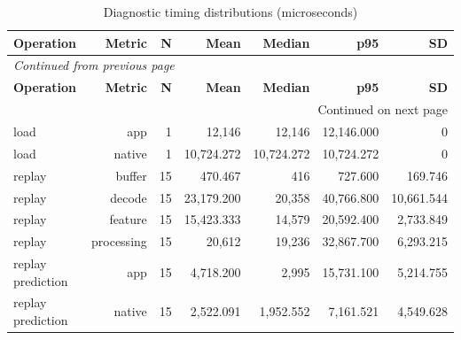 \documentclass[10pt,a4paper]{article}
\begin{document}
\begingroup\small\setlength{\tabcolsep}{4pt}\renewcommand{\arraystretch}{1.12}
\begin{longtable}{@{}lrrrrrr@{}}
\caption{Diagnostic timing distributions (microseconds)}\\
\toprule
\textbf{Operation} & \textbf{Metric} & \textbf{N} & \textbf{Mean} & \textbf{Median} & \textbf{p95} & \textbf{SD} \\
\midrule\endfirsthead
\multicolumn{7}{l}{\small\itshape Continued from previous page}\\
\toprule
\textbf{Operation} & \textbf{Metric} & \textbf{N} & \textbf{Mean} & \textbf{Median} & \textbf{p95} & \textbf{SD} \\
\midrule\endhead
\midrule\multicolumn{7}{r}{\small Continued on next page}\\\endfoot
\bottomrule\endlastfoot
load & app & 1 & 12,146 & 12,146 & 12,146.000 & 0 \\
load & native & 1 & 10,724.272 & 10,724.272 & 10,724.272 & 0 \\
replay & buffer & 15 & 470.467 & 416 & 727.600 & 169.746 \\
replay & decode & 15 & 23,179.200 & 20,358 & 40,766.800 & 10,661.544 \\
replay & feature & 15 & 15,423.333 & 14,579 & 20,592.400 & 2,733.849 \\
replay & processing & 15 & 20,612 & 19,236 & 32,867.700 & 6,293.215 \\
replay prediction & app & 15 & 4,718.200 & 2,995 & 15,731.100 & 5,214.755 \\
replay prediction & native & 15 & 2,522.091 & 1,952.552 & 7,161.521 & 4,549.628 \\
\end{longtable}\endgroup
\end{document}
